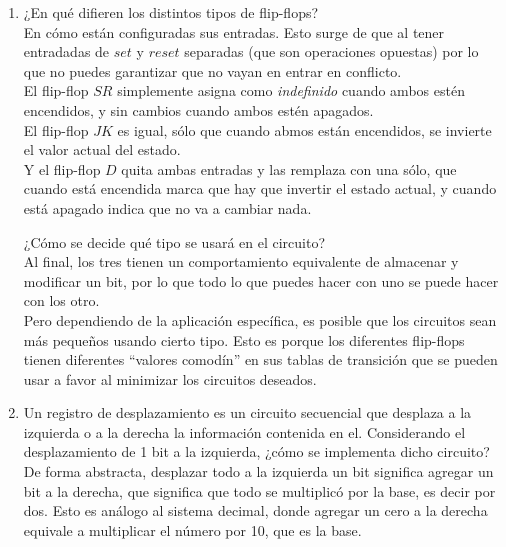 \documentclass{article}
\begin{document}
    \begin{enumerate}
        \item 
            ¿En qué difieren los distintos tipos de flip-flops?\\
            En cómo están configuradas sus entradas. Esto surge de que al tener 
            entradadas de $set$ y $reset$ separadas (que son operaciones 
            opuestas) por lo que no puedes garantizar que no vayan en entrar 
            en conflicto. \\
            El flip-flop $SR$ simplemente asigna como \textit{indefinido} cuando 
            ambos estén encendidos, y sin cambios cuando ambos estén apagados. \\
            El flip-flop $JK$ es igual, sólo que cuando abmos están encendidos, 
            se invierte el valor actual del estado.\\
            Y el flip-flop $D$ quita ambas entradas y las remplaza con una sólo, 
            que cuando está encendida marca que hay que invertir el estado 
            actual, y cuando está apagado indica que no va a cambiar nada.
            
            
            ¿Cómo se decide qué tipo se usará en el circuito?\\
            Al final, los tres tienen un comportamiento equivalente de almacenar
            y modificar un bit, por lo que todo lo que puedes hacer con uno se 
            puede hacer con los otro.\\
            Pero dependiendo de la aplicación específica, es posible que 
            los circuitos sean más pequeños usando cierto tipo. Esto es porque
            los diferentes flip-flops tienen diferentes ``valores comodín'' en 
            sus tablas de transición que se pueden usar a favor al minimizar los 
            circuitos deseados.
            

		\item
            Un registro de desplazamiento es un circuito secuencial que 
            desplaza a la izquierda o a la derecha la información contenida en 
            el. 
            Considerando el desplazamiento de 1 bit a la izquierda, ¿cómo se 
            implementa dicho circuito?\\
            De forma abstracta, desplazar todo a la izquierda un bit significa 
            agregar un bit a la derecha, que significa que todo se multiplicó 
            por la base, es decir por dos. Esto es análogo al sistema decimal, 
            donde agregar un cero a la derecha equivale a multiplicar el número 
            por 10, que es la base.
        

\end{enumerate}
\end{document}
